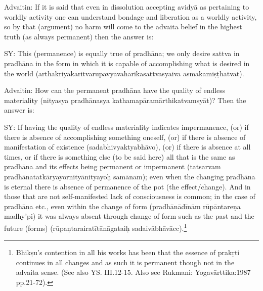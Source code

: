 Advaitin: If it is said that even in dissolution accepting avidyā as pertaining to worldly activity one can understand bondage and liberation as a worldly activity,  so by that (argument) no harm will come to the advaita belief in the highest truth (as always permanent) then the answer is:

SY: This (permanence) is equally true of pradhāna; we only desire sattva in pradhāna in the form in which it is capable of accomplishing what is desired in the world (arthakriyākāritvarūpavyāvahārikasattvasyaiva asmākamiṣṭhatvāt).

Advaitin: How can the permanent pradhāna have the quality of endless materiality (nityasya pradhānasya kathamapāramārthikatvam\break syāt)? Then the answer is:

SY: If having the quality of endless materiality indicates impermanence, (or) if there is absence of accomplishing something oneself, (or) if there is absence of manifestation of existence (sadabhivyaktyabhāvo), (or) if there is absence at all times, or if there is something else (to be said here) all that is the same as pradhāna and its effects being permanent or impermanent (tatsarvam pradhānatatkāryayornityānityayoḥ samānam); even when the changing pradhāna is eternal there is absence of permanence of the pot (the effect/change). And in those that are not self-manifested lack of consciousness is common; in the case of pradhāna etc., even within the change of form (pradhānādīnām rūpān\-tareṇa madhy’pi) it was always absent through change of form such as the past and the future (forms) (rūpaṇtarairatītānāgataiḥ sadaivābhāvācc).\footnote{Bhikṣu’s contention in all his works has been that the essence of prakṛti continues in all changes and as such it is permanent though not in the advaita sense. (See also YS. III.12-15. Also see Rukmani: Yogavārttika:1987 pp.21-72).}


